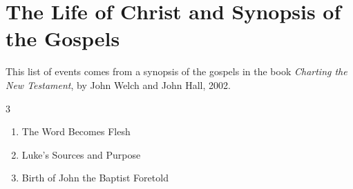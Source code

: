 \part{The Life of Christ and Synopsis of the Gospels}
	\label{LCHRIST}
	
	This list of events comes from a synopsis of the gospels in the book \textit{Charting the New Testament}, by John Welch and John Hall, 2002.
	
	\begin{multicols}{3}
	
	\begin{enumerate}
	
		\footnotesize
	
		\item The Word Becomes Flesh
			
		\item Luke's Sources and Purpose
			
		\item Birth of John the Baptist Foretold
			

\end{enumerate}
\end{multicols}
